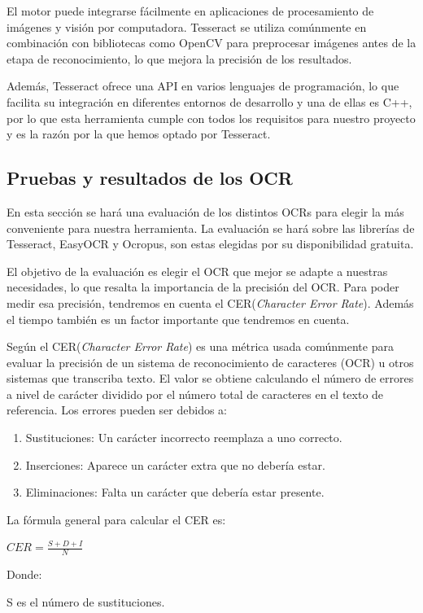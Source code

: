 \begin{enumerate}
	El motor puede integrarse fácilmente en aplicaciones de procesamiento de imágenes y visión por computadora. Tesseract se utiliza comúnmente en combinación con bibliotecas como OpenCV para preprocesar imágenes antes de la etapa de reconocimiento, lo que mejora la precisión de los resultados.
	
	Además, Tesseract ofrece una API en varios lenguajes de programación, lo que facilita su integración en diferentes entornos de desarrollo y una de ellas es C++, por lo que esta herramienta cumple con todos los requisitos para nuestro proyecto y es la razón por la que hemos optado por Tesseract.
\end{enumerate}
\subsection{Pruebas y resultados de los OCR}
En esta sección se hará una evaluación de los distintos OCRs para elegir la más conveniente para nuestra herramienta.
La evaluación se hará sobre las librerías de Tesseract, EasyOCR y Ocropus, son estas elegidas por su disponibilidad gratuita.

El objetivo de la evaluación es elegir el OCR que mejor se adapte a nuestras necesidades, lo que resalta la importancia de la precisión del OCR.
Para poder medir esa precisión, tendremos en cuenta el CER(\textit{Character Error Rate}). Además el tiempo también es un factor importante que tendremos en cuenta.

Según \cite{CER} el CER(\textit{Character Error Rate}) es una métrica usada comúnmente para evaluar la precisión de un sistema de reconocimiento de caracteres (OCR) u otros sistemas que transcriba texto. El valor se obtiene calculando el número de errores a nivel de carácter dividido por el número total de caracteres en el texto de referencia.
Los errores pueden ser debidos a:
\begin{enumerate}
	\item Sustituciones: Un carácter incorrecto reemplaza a uno correcto.
	\item Inserciones: Aparece un carácter extra que no debería estar.
	\item Eliminaciones: Falta un carácter que debería estar presente.
\end{enumerate}
La fórmula general para calcular el CER es:

$CER = \frac{S+D+I}{N} $ 

Donde:

S es el número de sustituciones.

